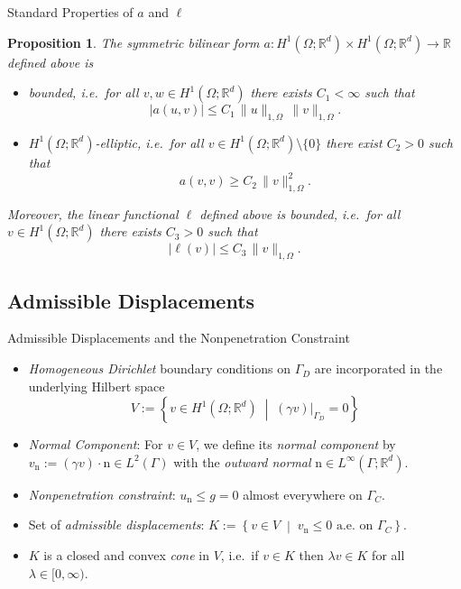 \documentclass[10pt,aspectratio=169]{beamer}
\newtheorem{proposition}{Proposition}[section]
\def\R{{\mathbb R}}
\begin{document}
\begin{frame}{Standard Properties of $a$ and $\ell$}
	\begin{proposition}
		The symmetric bilinear form $a:H^1(\Omega;\R^d)\times H^1(\Omega;\R^d)\to \R$ defined above is
		\begin{itemize}
			\item[i)] {\em bounded}, i.e.\ for all $v,w\in H^1(\Omega;\R^d)$ there exists $C_1<\infty$ such that
			      \begin{equation*}
				      |a(u,v)|\le C_1\,\|u\|_{1,\Omega}\,\|v\|_{1,\Omega}.
			      \end{equation*}
			\item[ii)] $H^1(\Omega;\R^d)${\em -elliptic}, i.e.\ for all $v\in H^1(\Omega;\R^d)\setminus\{0\}$ there exist $C_2>0$ such that
			      \begin{equation*}
				      a(v,v)\ge C_2\,\|v\|_{1,\Omega}^2.
			      \end{equation*}
		\end{itemize}
		Moreover, the linear functional $\ell$ defined above is {\em bounded}, i.e.\ for all $v\in H^1(\Omega;\R^d)$ there exists $C_3>0$ such that
		\begin{equation*}
			|\ell (v)|\le C_3\,\|v\|_{1,\Omega}.
		\end{equation*}
	\end{proposition}
\end{frame}

\subsection{Admissible Displacements}

\begin{frame}{Admissible Displacements and the Nonpenetration Constraint}
	\begin{itemize}
		\item {\em Homogeneous Dirichlet} boundary conditions on $\Gamma_D$ are incorporated in the underlying Hilbert space
		      \begin{equation*}
			      V:=\left\{ v\in H^1(\Omega;\R^d)\;\middle|\; (\gamma v)|_{\Gamma_D}=0\right\}
		      \end{equation*}
		\item {\em Normal Component}: For $v\in V$, we define its {\em normal component} by $v_\mathrm{n}:= (\gamma v)\cdot \mathrm{n}\in L^2(\Gamma)$ with the {\em outward normal} $\mathrm{n}\in L^\infty(\Gamma;\R^d)$.
		\item {\em Nonpenetration constraint}: $u_\mathrm{n}\le g = 0$ almost everywhere on $\Gamma_C$.
		\item Set of {\em admissible displacements}: $K := \left\{ v\in V\;\middle|\; v_{\mathrm n}\le 0 \text{ a.e.\ on }\Gamma_C\right\}$.
		\item $K$ is a closed and convex {\em cone} in $V$, i.e.\ if $v\in K$ then $\lambda v\in K$ for all $\lambda\in [0,\infty)$.
	\end{itemize}
	\begin{figure}[!h]
		\centering
		
	\end{figure}
\end{frame}
\end{document}

